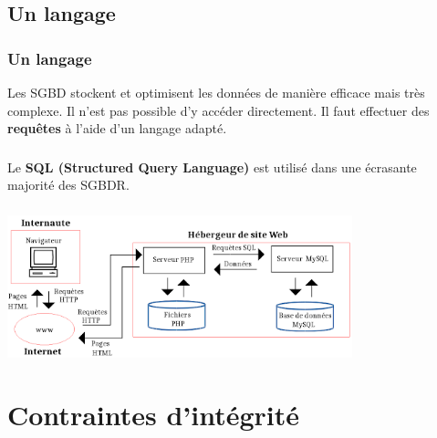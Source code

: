\documentclass[svgnames,11pt]{beamer}
\begin{document}
\subsection{Un langage}
\begin{frame}
    \frametitle{Un langage}

    Les SGBD stockent et optimisent les données de manière efficace mais très complexe. Il n'est pas possible d'y accéder directement. Il faut effectuer des \textbf{requêtes} à l'aide d'un langage adapté.

\end{frame}
\begin{frame}
    \frametitle{}

    \begin{aretenir}[]
        Le \textbf{SQL (Structured Query Language)} est utilisé dans une écrasante majorité des SGBDR.
    \end{aretenir}
\end{frame}
\begin{frame}
    \frametitle{}

    \begin{center}
        \centering
        \includegraphics[width=10cm]{ressources/requete-http.png}
        \label{IMG}
    \end{center}

\end{frame}
\section{Contraintes d'intégrité}
\end{document}
